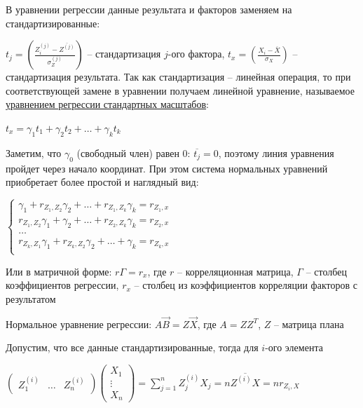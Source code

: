 \begin{enumerate}
    В уравнении регрессии данные результата и факторов заменяем на стандартизированные: 

    $t_j = \left(\frac{Z^{(j)}_i - \overline{Z^{(j)}}}{\sigma_{Z}^{(j)}}\right)$ -- стандартизация $j$-ого фактора, $t_x = \left(\frac{X_i - \overline{X}}{\sigma_X}\right)$ -- стандартизация результата. Так как стандартизация -- линейная операция, то при соответствующей замене в уравнении получаем линейной уравнение,
    называемое \hyperlink{standard_regression_equation}{уравнением регрессии стандартных масштабов}:

    $t_x = \gamma_1 t_1 + \gamma_2 t_2 + \dots + \gamma_k t_k$

    \Nota Заметим, что $\gamma_0$ (свободный член) равен 0: $\overline{t_j} = 0$, поэтому линия уравнения пройдет через начало координат.
    При этом система нормальных уравнений приобретает более простой и наглядный вид:

    \smallvspace

    $\begin{cases}
        \gamma_1 + r_{Z_1, Z_2} \gamma_2 + \dots + r_{Z_1, Z_k} \gamma_k = r_{Z_1, x} \\
        r_{Z_1, Z_2} \gamma_1 + \gamma_2 + \dots + r_{Z_2, Z_k} \gamma_k = r_{Z_2, x} \\
        \dots \\
        r_{Z_k, Z_1} \gamma_1 + r_{Z_k, Z_2} \gamma_2 + \dots + \gamma_k = r_{Z_k, x} \\
    \end{cases}$

    \smallvspace

    Или в матричной форме: $r \Gamma = r_x$, где $r$ -- корреляционная матрица, $\Gamma$ -- столбец коэффициентов регрессии, $r_x$ -- столбец из коэффициентов корреляции факторов с результатом

    Нормальное уравнение регрессии: $A \vec B = Z \vec X$, где $A = Z Z^T$, $Z$ -- матрица плана

    Допустим, что все данные стандартизированные, тогда для $i$-ого элемента

    $\begin{pmatrix}Z_1^{(i)} & \dots & Z_n^{(i)}\end{pmatrix} \begin{pmatrix}X_1 \\ \vdots \\ X_n\end{pmatrix} = 
    \sum_{j = 1}^n Z^{(i)}_j X_j = n \overline{Z^{(i)} X} = n r_{Z_i, X}$


\end{enumerate}
